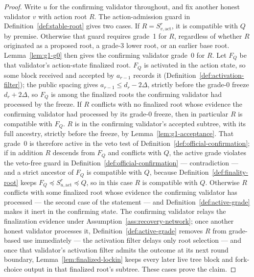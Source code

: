 \begin{proof}
Write \(u\) for the confirming validator throughout, and fix another
honest validator \(v\) with action root \(R\).  The action-admission
guard in Definition~\ref{def:stable-root} gives two cases.
If \(R=S_{v,\mathrm{act}}^r\), it is compatible with \(Q\) by premise.
Otherwise that guard requires grade~1 for \(R\), regardless of whether
\(R\) originated as a proposed root, a grade-3 lower root, or an earlier
base root.  Lemma~\ref{lem:g1-g0} then gives the confirming validator
grade~0 for \(R\).  Let \(F_Q\) be that validator's action-state finalized
root.  \(F_Q\) is activated in the action state, so some block received
and accepted by \(a_{r-1}\) records it
(Definition~\ref{def:activation-filter}); the public spacing gives
\(a_{r-1}\leq d_r-2\Delta\), strictly before the grade-0 freeze
\(d_r+2\Delta\), so \(F_Q\) is among the finalized roots the confirming
validator had processed by the freeze.  If \(R\) conflicts with no
finalized root whose evidence the
confirming validator had processed by its grade-0 freeze, then in
particular \(R\) is compatible with \(F_Q\).  \(R\) is in the
confirming validator's accepted subtree, with its full ancestry,
strictly before the freeze, by Lemma~\ref{lem:g1-acceptance}.  That grade~0 is
therefore active in the veto test of
Definition~\ref{def:official-confirmation}; if in addition \(R\) descends from
\(F_Q\) and conflicts with \(Q\), the active grade
violates the veto-free guard in
Definition~\ref{def:official-confirmation} --- contradiction --- and a
strict ancestor of \(F_Q\) is compatible with \(Q\), because
Definition~\ref{def:finality-root} keeps \(F_Q\preceq S_{u,\mathrm{act}}^r\preceq Q\),
so in this case \(R\) is compatible with \(Q\).  Otherwise \(R\)
conflicts with some finalized root whose evidence the confirming
validator has processed --- the second case of the statement --- and
Definition~\ref{def:active-grade} makes it inert in the confirming state.
The confirming validator relays the finalization evidence under
Assumption~\ref{ass:recovery-network}; once another honest validator
processes it, Definition~\ref{def:active-grade} removes \(R\) from
grade-based use immediately --- the activation filter delays only root
selection --- and once that validator's activation filter admits the
outcome at its next round boundary, Lemma~\ref{lem:finalized-lockin} keeps
every later live tree block and fork-choice output in that finalized
root's subtree.  These
cases prove the claim.
\end{proof}

